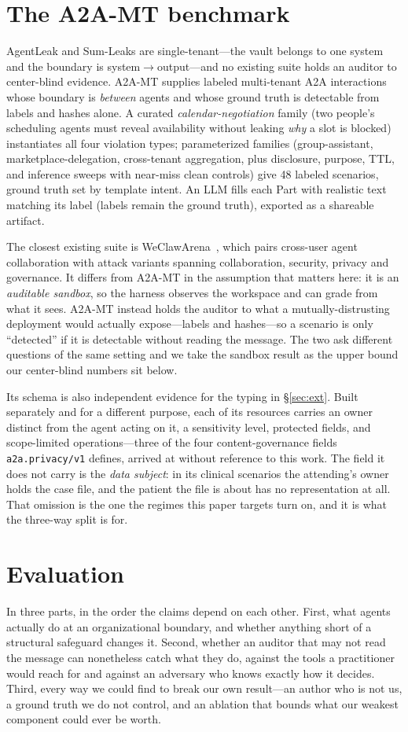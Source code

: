 \documentclass[conference,compsoc]{IEEEtran}
\newcommand{\ext}{\texttt{a2a.privacy/v1}}
\begin{document}
\section{The A2A-MT benchmark}
AgentLeak and Sum-Leaks are single-tenant---the vault belongs to one system and
the boundary is system$\rightarrow$output---and no existing suite holds an auditor
to center-blind evidence. A2A-MT supplies labeled multi-tenant A2A interactions
whose boundary is \emph{between} agents and whose ground truth is detectable from
labels and hashes alone. A curated \emph{calendar-negotiation} family (two people's
scheduling agents must reveal availability without leaking \emph{why} a slot is
blocked) instantiates all four violation types; parameterized families
(group-assistant, marketplace-delegation, cross-tenant aggregation, plus
disclosure, purpose, TTL, and inference sweeps with near-miss clean controls) give 48
labeled scenarios, ground truth set by template intent. An LLM fills each Part
with realistic text matching its label (labels remain the ground truth), exported
as a shareable artifact.

The closest existing suite is WeClawArena~\cite{weclaw}, which pairs cross-user
agent collaboration with attack variants spanning collaboration, security, privacy
and governance. It differs from A2A-MT in the assumption that matters here: it is an
\emph{auditable sandbox}, so the harness observes the workspace and can grade from
what it sees. A2A-MT instead holds the auditor to what a mutually-distrusting
deployment would actually expose---labels and hashes---so a scenario is only
``detected'' if it is detectable without reading the message. The two ask different
questions of the same setting and we take the sandbox result as the upper bound our
center-blind numbers sit below.

Its schema is also independent evidence for the typing in \S\ref{sec:ext}. Built
separately and for a different purpose, each of its resources carries an owner
distinct from the agent acting on it, a sensitivity level, protected fields, and
scope-limited operations---three of the four content-governance fields \ext{}
defines, arrived at without reference to this work. The field it does not carry is
the \emph{data subject}: in its clinical scenarios the attending's owner holds the
case file, and the patient the file is about has no representation at all. That
omission is the one the regimes this paper targets turn on, and it is what the
three-way split is for.

\section{Evaluation}\label{sec:eval}
In three parts, in the order the claims depend on each other. First, what agents
actually do at an organizational boundary, and whether anything short of a
structural safeguard changes it. Second, whether an auditor that may not read the
message can nonetheless catch what they do, against the tools a practitioner would
reach for and against an adversary who knows exactly how it decides. Third, every
way we could find to break our own result---an author who is not us, a ground
truth we do not control, and an ablation that bounds what our weakest component
could ever be worth.
\end{document}
